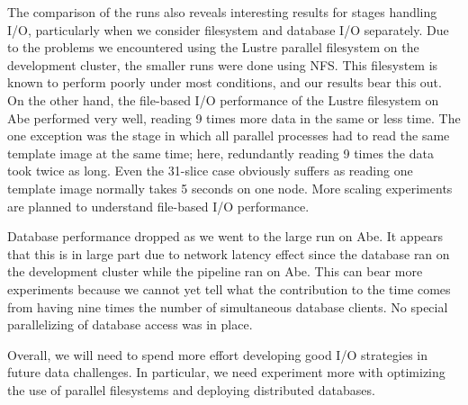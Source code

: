 The comparison of the runs also reveals interesting results for stages
handling I/O, particularly when we consider filesystem and database
I/O separately.  Due to the problems we encountered using the Lustre
parallel filesystem on the development cluster, the smaller runs were
done using NFS.  This filesystem is known to perform poorly under most
conditions, and our results bear this out.  On the other hand, the
file-based I/O performance of the Lustre filesystem on Abe performed
very well, reading 9 times more data in the same or less time.  The one
exception was the stage in which all parallel processes had to read
the same template image at the same time; here, redundantly reading 9
times the data took twice as long.  Even the 31-slice case obviously
suffers as reading one template image normally takes 5 seconds on one
node.  More scaling experiments are planned to understand file-based
I/O performance.  

Database performance dropped as we went to the large run on Abe.  It
appears that this is in large part due to network latency effect since
the database ran on the development cluster while the pipeline ran on
Abe.  This can bear more experiments because we cannot yet tell what
the contribution to the time comes from having nine times the number
of simultaneous database clients.  No special parallelizing of
database access was in place.  

Overall, we will need to spend more effort developing good I/O
strategies in future data challenges.  In particular, we need
experiment more with optimizing the use of parallel filesystems and
deploying distributed databases.  

